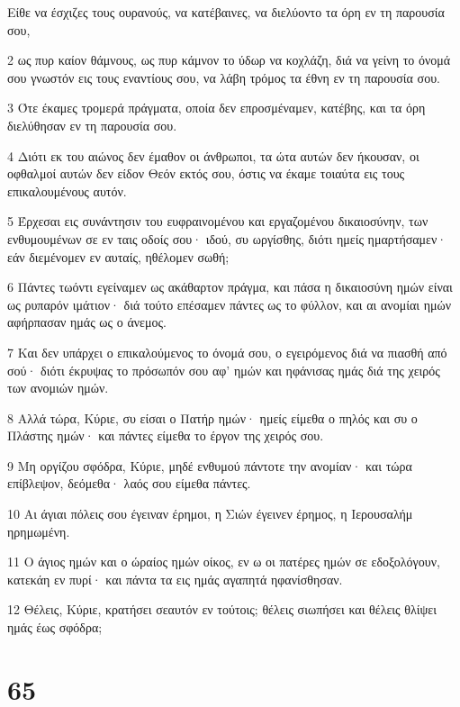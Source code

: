 \par Είθε να έσχιζες τους ουρανούς, να κατέβαινες, να διελύοντο τα όρη εν τη παρουσία σου,
\par 2 ως πυρ καίον θάμνους, ως πυρ κάμνον το ύδωρ να κοχλάζη, διά να γείνη το όνομά σου γνωστόν εις τους εναντίους σου, να λάβη τρόμος τα έθνη εν τη παρουσία σου.
\par 3 Ότε έκαμες τρομερά πράγματα, οποία δεν επροσμέναμεν, κατέβης, και τα όρη διελύθησαν εν τη παρουσία σου.
\par 4 Διότι εκ του αιώνος δεν έμαθον οι άνθρωποι, τα ώτα αυτών δεν ήκουσαν, οι οφθαλμοί αυτών δεν είδον Θεόν εκτός σου, όστις να έκαμε τοιαύτα εις τους επικαλουμένους αυτόν.
\par 5 Έρχεσαι εις συνάντησιν του ευφραινομένου και εργαζομένου δικαιοσύνην, των ενθυμουμένων σε εν ταις οδοίς σου· ιδού, συ ωργίσθης, διότι ημείς ημαρτήσαμεν· εάν διεμένομεν εν αυταίς, ηθέλομεν σωθή;
\par 6 Πάντες τωόντι εγείναμεν ως ακάθαρτον πράγμα, και πάσα η δικαιοσύνη ημών είναι ως ρυπαρόν ιμάτιον· διά τούτο επέσαμεν πάντες ως το φύλλον, και αι ανομίαι ημών αφήρπασαν ημάς ως ο άνεμος.
\par 7 Και δεν υπάρχει ο επικαλούμενος το όνομά σου, ο εγειρόμενος διά να πιασθή από σού· διότι έκρυψας το πρόσωπόν σου αφ' ημών και ηφάνισας ημάς διά της χειρός των ανομιών ημών.
\par 8 Αλλά τώρα, Κύριε, συ είσαι ο Πατήρ ημών· ημείς είμεθα ο πηλός και συ ο Πλάστης ημών· και πάντες είμεθα το έργον της χειρός σου.
\par 9 Μη οργίζου σφόδρα, Κύριε, μηδέ ενθυμού πάντοτε την ανομίαν· και τώρα επίβλεψον, δεόμεθα· λαός σου είμεθα πάντες.
\par 10 Αι άγιαι πόλεις σου έγειναν έρημοι, η Σιών έγεινεν έρημος, η Ιερουσαλήμ ηρημωμένη.
\par 11 Ο άγιος ημών και ο ώραίος ημών οίκος, εν ω οι πατέρες ημών σε εδοξολόγουν, κατεκάη εν πυρί· και πάντα τα εις ημάς αγαπητά ηφανίσθησαν.
\par 12 Θέλεις, Κύριε, κρατήσει σεαυτόν εν τούτοις; θέλεις σιωπήσει και θέλεις θλίψει ημάς έως σφόδρα;

\chapter{65}

